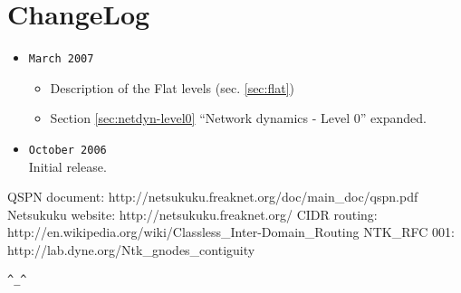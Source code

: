 \documentclass[a4paper]{article}
\newcommand{\href}[2]{ #1 }
\begin{document}
\section{ChangeLog}
\begin{itemize}
	\item \verb|March 2007|
		\begin{itemize}
			\item Description of the Flat levels (sec. \ref{sec:flat})
			\item Section \ref{sec:netdyn-level0} ``Network dynamics - Level 0'' expanded.
		\end{itemize}
	\item \verb|October 2006|\\
		Initial release.
\end{itemize}
\begin{thebibliography}{99}
	 QSPN document:
		\href{http://netsukuku.freaknet.org/doc/main\_doc/qspn.pdf}{qspn.pdf}
	 Netsukuku website:
		\href{http://netsukuku.freaknet.org/}{http://netsukuku.freaknet.org/}
	 CIDR routing:
		\href{http://en.wikipedia.org/wiki/Classless\_Inter-Domain\_Routing}{Classless\_Inter-Domain\_Routing in Wikipedia}
	 NTK\_RFC 001:
		\href{http://lab.dyne.org/Ntk\_gnodes\_contiguity}{Gnode contiguity}
\end{thebibliography}
\newpage

\begin{center}
\verb|^_^|
\end{center}
\end{document}
